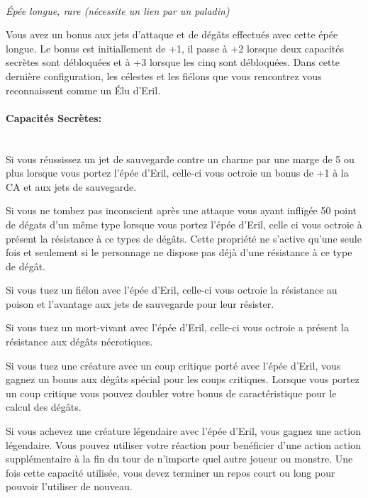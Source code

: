 \\
{\small \it Épée longue, rare (nécessite un lien par
un paladin)}\\
\label{EpeeEril}

Vous avez un bonus aux jets d'attaque et de dégâts effectués avec cette 
épée longue. Le bonus est initiallement de +1, il passe à +2 lorsque deux
capacités secrètes sont débloquées et à +3 lorsque les cinq sont débloquées.
Dans cette dernière configuration, les célestes et 
les fiélons que vous rencontrez vous reconnaissent comme un Élu d'Eril.

\paragraph{Capacités Secrètes:} ~ \\

Si vous réussissez un jet de sauvegarde contre un charme par une marge
de 5 ou plus lorsque vous portez l'épée d'Eril, celle-ci vous octroie
un bonus de +1 à la CA et aux jets de sauvegarde.

Si vous ne tombez pas inconscient après une attaque vous ayant infligée
50 point de dégats d'un même type lorsque vous portez l'épée d'Eril,
celle ci vous octroie à présent la résistance à ce types de dégâts. Cette 
propriété ne s'active qu'une seule fois et seulement si le personnage ne
dispose pas déjà d'une résistance à ce type de dégât. 

Si vous tuez un fiélon avec l'épée d'Eril, celle-ci vous octroie
la résistance au poison et l'avantage aux jets de sauvegarde pour leur
résister.

Si vous tuez un mort-vivant avec l'épée d'Eril, celle-ci vous octroie
a présent la résistance aux dégâts nécrotiques.

Si vous tuez une créature avec un coup critique porté avec l'épée d'Eril,
vous gagnez un bonus aux dégâts spécial pour les coups critiques. Lorsque 
vous portez un coup critique
vous pouvez doubler votre bonus de caractéristique pour le calcul des dégâts.

Si vous achevez une créature légendaire avec l'épée d'Eril, vous gagnez
une action légendaire. Vous pouvez utiliser votre réaction pour benéficier
d'une action action supplémentaire à la fin du tour de n'importe quel autre 
joueur ou monstre. Une fois cette capacité 
utilisée, vous devez terminer un repos court ou long pour pouvoir l'utiliser 
de nouveau. \\
